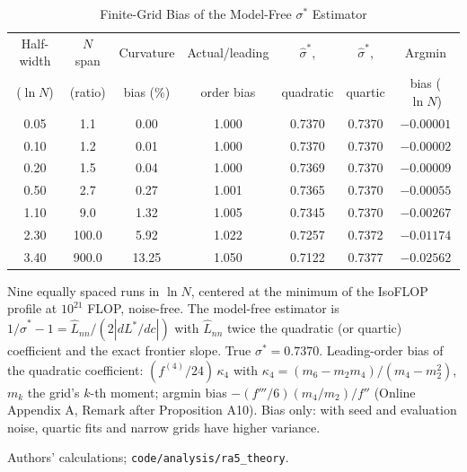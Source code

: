 \begin{table}[tp]
\centering
\caption{Finite-Grid Bias of the Model-Free $\sigma^*$ Estimator}
\label{tab:ra5-finite-grid}
\footnotesize
\setlength{\tabcolsep}{4pt}
\begin{tabular}{@{}ccccccc@{}}
\toprule
Half-width & $N$ span & Curvature & Actual/leading & $\hat\sigma^*$, & $\hat\sigma^*$, & Argmin \\
($\ln N$) & (ratio) & bias (\%) & order bias & quadratic & quartic & bias ($\ln N$) \\
\midrule
0.05 & 1.1 & 0.00 & 1.000 & 0.7370 & 0.7370 & $-0.00001$ \\
0.10 & 1.2 & 0.01 & 1.000 & 0.7370 & 0.7370 & $-0.00002$ \\
0.20 & 1.5 & 0.04 & 1.000 & 0.7369 & 0.7370 & $-0.00009$ \\
0.50 & 2.7 & 0.27 & 1.001 & 0.7365 & 0.7370 & $-0.00055$ \\
1.10 & 9.0 & 1.32 & 1.005 & 0.7345 & 0.7370 & $-0.00267$ \\
2.30 & 100.0 & 5.92 & 1.022 & 0.7257 & 0.7372 & $-0.01174$ \\
3.40 & 900.0 & 13.25 & 1.050 & 0.7122 & 0.7377 & $-0.02562$ \\
\bottomrule
\end{tabular}
\par\smallskip
\begin{tablenotes}Nine equally spaced runs in $\ln N$, centered at the minimum of the \citet{besiroglu2024chinchilla} IsoFLOP profile at $10^{21}$ FLOP, noise-free. The model-free estimator is $1/\hat\sigma^*-1=\hat L_{nn}/(2|dL^*/dc|)$ with $\hat L_{nn}$ twice the quadratic (or quartic) coefficient and the exact frontier slope. True $\sigma^*=0.7370$. Leading-order bias of the quadratic coefficient: $(f^{(4)}/24)\,\kappa_4$ with $\kappa_4=(m_6-m_2m_4)/(m_4-m_2^2)$, $m_k$ the grid's $k$-th moment; argmin bias $-(f'''/6)(m_4/m_2)/f''$ (Online Appendix A, Remark after Proposition A10). Bias only: with seed and evaluation noise, quartic fits and narrow grids have higher variance.\end{tablenotes}
\begin{tablenotes}[Source]Authors' calculations; \texttt{code/analysis/ra5\_theory}.\end{tablenotes}
\end{table}
